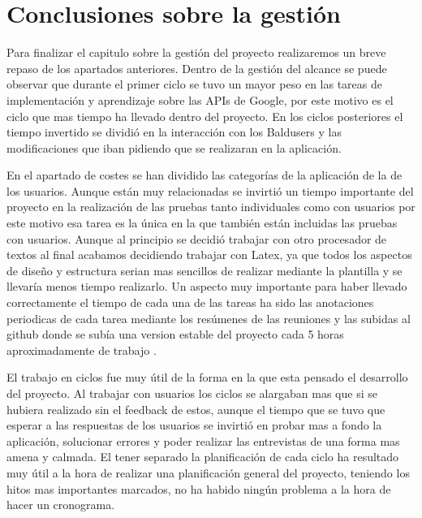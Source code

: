 \section{Conclusiones sobre la gestión}
\label{secc:Conclusiones sobre la gestión}

Para finalizar el capitulo sobre la gestión del proyecto realizaremos un breve repaso de los apartados anteriores. Dentro de la gestión del alcance se puede observar que durante el primer ciclo se tuvo un mayor peso en las tareas de implementación y aprendizaje sobre las APIs de Google, por este motivo es el ciclo que mas tiempo ha llevado dentro del proyecto. En los ciclos posteriores el tiempo invertido se dividió en la interacción con los Baldusers y las modificaciones que iban pidiendo que se realizaran en la aplicación.

En el apartado de costes se han dividido las categorías de la aplicación de la de los usuarios. Aunque están muy relacionadas se invirtió un tiempo importante del proyecto en la realización de las pruebas tanto individuales como con usuarios por este motivo esa tarea es la única en la que también están incluidas las pruebas con usuarios.
Aunque al principio se decidió trabajar con otro procesador de textos al final acabamos decidiendo trabajar con Latex, ya que todos los aspectos de diseño y estructura serian mas sencillos de realizar mediante la plantilla y se llevaría menos tiempo realizarlo.
Un aspecto muy importante para haber llevado correctamente el tiempo de cada una de las tareas ha sido las anotaciones periodicas de cada tarea mediante los resúmenes de las reuniones y las subidas al github donde se subía una version estable del proyecto cada 5 horas aproximadamente de trabajo .

El trabajo en ciclos fue muy útil de la forma en la que esta pensado el desarrollo del proyecto. Al trabajar con usuarios los ciclos se alargaban mas que si se hubiera realizado sin el feedback de estos, aunque el tiempo que se tuvo que esperar a las respuestas de los usuarios se invirtió en probar mas a fondo la aplicación, solucionar errores y poder realizar las entrevistas de una forma mas amena y calmada.
El tener separado la planificación de cada ciclo ha resultado muy útil a la hora de realizar una planificación general del proyecto, teniendo los hitos mas importantes marcados, no ha habido ningún problema a la hora de hacer un cronograma.




